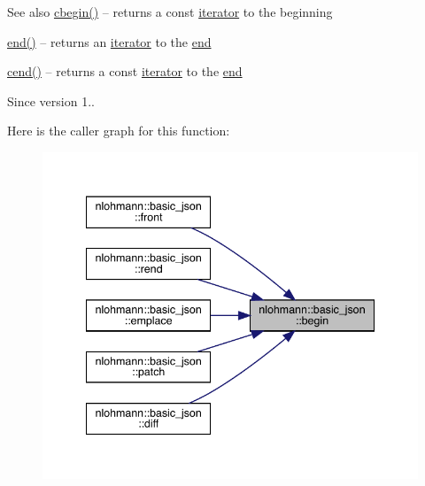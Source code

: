 \begin{DoxySeeAlso}{See also}
\mbox{\hyperlink{classnlohmann_1_1basic__json_ad865d6c291b237ae508d5cb2146b5877}{cbegin()}} -- returns a const \mbox{\hyperlink{classnlohmann_1_1basic__json_a099316232c76c034030a38faa6e34dca}{iterator}} to the beginning 

\mbox{\hyperlink{classnlohmann_1_1basic__json_a13e032a02a7fd8a93fdddc2fcbc4763c}{end()}} -- returns an \mbox{\hyperlink{classnlohmann_1_1basic__json_a099316232c76c034030a38faa6e34dca}{iterator}} to the \mbox{\hyperlink{classnlohmann_1_1basic__json_a13e032a02a7fd8a93fdddc2fcbc4763c}{end}} 

\mbox{\hyperlink{classnlohmann_1_1basic__json_a8dba7b7d2f38e6b0c614030aa43983f6}{cend()}} -- returns a const \mbox{\hyperlink{classnlohmann_1_1basic__json_a099316232c76c034030a38faa6e34dca}{iterator}} to the \mbox{\hyperlink{classnlohmann_1_1basic__json_a13e032a02a7fd8a93fdddc2fcbc4763c}{end}}
\end{DoxySeeAlso}
\begin{DoxySince}{Since}
version 1.. 
\end{DoxySince}
Here is the caller graph for this function\+:
\nopagebreak
\begin{figure}[H]
\begin{center}
\leavevmode
\includegraphics[width=341pt]{classnlohmann_1_1basic__json_a0ff28dac23f2bdecee9564d07f51dcdc_icgraph}
\end{center}
\end{figure}
\mbox{\label{classnlohmann_1_1basic__json_a4f0f5dd42b2987ff20306ed78bd31d1d}} 
